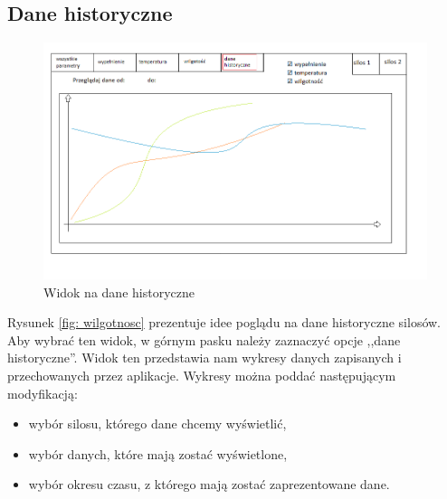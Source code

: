     \subsection{Dane historyczne}
        \begin{figure}[H]
            \centering
            \includegraphics[width = \textwidth]{obrazy/projekt_grafiki/wykresy.png}
            \caption{Widok na dane historyczne}
            \label{fig: dane historyczne}
        \end{figure}
        Rysunek \ref{fig: wilgotnosc} prezentuje idee poglądu na dane historyczne silosów. Aby wybrać ten widok,
        w górnym pasku należy zaznaczyć opcje ,,dane historyczne''. Widok ten przedstawia nam wykresy danych zapisanych i przechowanych przez aplikacje.
        Wykresy można poddać następującym modyfikacją:
        \begin{itemize}
            \item wybór silosu, którego dane chcemy wyświetlić,
            \item wybór danych, które mają zostać wyświetlone,
            \item wybór okresu czasu, z którego mają zostać zaprezentowane  dane.
        \end{itemize}
        